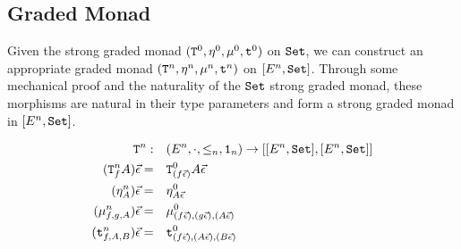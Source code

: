 \documentclass{report}
\begin{document}
\subsection{Graded Monad}
Given the strong graded monad $(\texttt{T}^0_{}, \eta_{}^0{}{}, \mu^0, \texttt{t}^0)$ on $\texttt{Set}$, we can construct an appropriate graded monad $(\texttt{T}^n_{}, \eta_{}^n{}{}, \mu^n,\texttt{t}^n)$ on $[E^n, \texttt{Set}]$. Through some mechanical proof and the naturality of the $\texttt{Set}$ strong graded monad, these morphisms are natural in their type parameters and form a strong graded monad in $[E^n, \texttt{Set}]$.

\begin{align*}
    \texttt{T}^n_{}:&\quad(E^n, \cdot, \leq_n, \texttt{1}_n) \rightarrow [[E^n, \texttt{Set}], [E^n, \texttt{Set}]]\\
    (\texttt{T}^n_{f}A)\vec{\epsilon}=&\quad \texttt{T}^0_{(f\vec{\epsilon})}A\vec{\epsilon}\\
    (\eta_{A}^n)\vec{\epsilon}=&\quad\eta_{A\vec{\epsilon}}^0\\
    (\mu_{f, g, A}^n)\vec{\epsilon}=&\quad\mu_{(f\vec{\epsilon}), (g\vec{\epsilon}), (A\vec{\epsilon})}^0\\
    (\texttt{t}_{f, A, B}^n)\vec{\epsilon}=&\quad\texttt{t}_{(f\vec{\epsilon}), (A\vec{\epsilon}), (B\vec{\epsilon})}^0
\end{align*}
\end{document}
